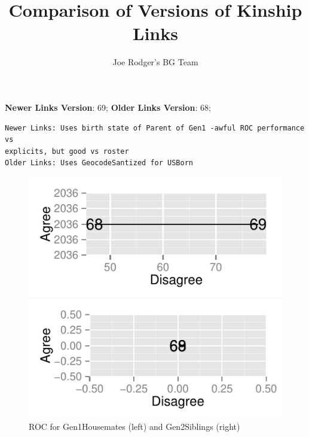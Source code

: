 \documentclass[a4paper]{article}\usepackage{graphicx, color}
\title{Comparison of Versions of Kinship Links}
\author{Joe Rodger's BG Team}
\makeatletter
\def\maxwidth{ %
  \ifdim\Gin@nat@width>\linewidth
    \linewidth
  \else
    \Gin@nat@width
  \fi
}
\newenvironment{kframe}{%
 \def\at@end@of@kframe{}%
 \ifinner\ifhmode%
  \def\at@end@of@kframe{\end{minipage}}%
  \begin{minipage}{\columnwidth}%
 \fi\fi%
 \def\FrameCommand##1{\hskip\@totalleftmargin \hskip-\fboxsep
 \colorbox{shadecolor}{##1}\hskip-\fboxsep
     \hskip-\linewidth \hskip-\@totalleftmargin \hskip\columnwidth}%
 \MakeFramed {\advance\hsize-\width
   \@totalleftmargin\z@ \linewidth\hsize
   \@setminipage}}%
 {\par\unskip\endMakeFramed%
 \at@end@of@kframe}
\newenvironment{knitrout}{}{} %
\makeatother
\begin{document}
\maketitle

\setlength{\parindent}{0pt}%







\textbf{Newer Links Version}: 69;
\textbf{Older Links Version}: 68;

\begin{knitrout}
\color{fgcolor}\begin{kframe}
\begin{verbatim}
Newer Links: Uses birth state of Parent of Gen1 -awful ROC performance vs
explicits, but good vs roster
Older Links: Uses GeocodeSantized for USBorn
\end{verbatim}
\end{kframe}
\end{knitrout}


\begin{figure}[htbp]
\begin{knitrout}
\color{fgcolor}
\includegraphics[width=\maxwidth]{figure/unnamed-chunk-31} 

\includegraphics[width=\maxwidth]{figure/unnamed-chunk-32} 

\end{knitrout}

\caption{ROC for Gen1Housemates (left) and Gen2Siblings (right)}
\end{figure}
\end{document}
